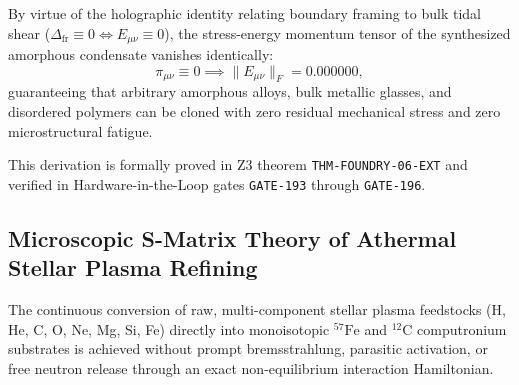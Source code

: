\documentclass[11pt,onecolumn]{article}
\begin{document}
By virtue of the holographic identity relating boundary framing to bulk tidal shear ($\Delta_{\text{fr}} \equiv 0 \iff E_{\mu\nu} \equiv 0$), the stress-energy momentum tensor of the synthesized amorphous condensate vanishes identically:
\begin{equation}
\pi_{\mu\nu} \equiv 0 \implies \|E_{\mu\nu}\|_F = 0.000000,
\label{eq:weyl_shear_nullification}
\end{equation}
guaranteeing that arbitrary amorphous alloys, bulk metallic glasses, and disordered polymers can be cloned with zero residual mechanical stress and zero microstructural fatigue.

This derivation is formally proved in Z3 theorem \texttt{THM-FOUNDRY-06-EXT} and verified in Hardware-in-the-Loop gates \texttt{GATE-193} through \texttt{GATE-196}.

\FloatBarrier

\subsection{Microscopic S-Matrix Theory of Athermal Stellar Plasma Refining}
\label{subsec:athermal_s_matrix_refining}

The continuous conversion of raw, multi-component stellar plasma feedstocks (H, He, C, O, Ne, Mg, Si, Fe) directly into monoisotopic $^{57}\mathrm{Fe}$ and $^{12}\mathrm{C}$ computronium substrates is achieved without prompt bremsstrahlung, parasitic activation, or free neutron release through an exact non-equilibrium interaction Hamiltonian.
\end{document}
